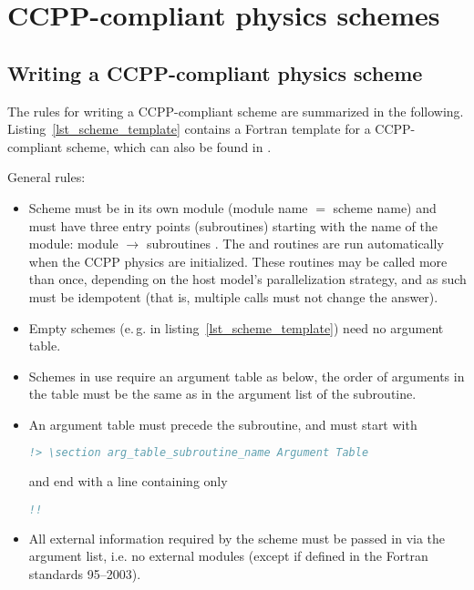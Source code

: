 \chapter{CCPP-compliant physics schemes}
\label{chap_schemes}
\setlength{\parskip}{12pt}

\section{Writing a CCPP-compliant physics scheme}
\label{sec_writescheme}
The rules for writing a CCPP-compliant scheme are summarized in the following. Listing~\ref{lst_scheme_template} contains a Fortran template for a CCPP-compliant scheme, which can also be found in .

General rules:
\begin{itemize}
\item Scheme must be in its own module (module name $=$ scheme name) and must have three entry points (subroutines) starting with the name of the module: module  $\rightarrow$ subroutines . The  and  routines are run automatically when the CCPP physics are initialized. These routines may be called more than once, depending on the host model's parallelization strategy, and as such must be idempotent (that is, multiple calls must not change the answer).
\item Empty schemes (e.\,g.  in listing~\ref{lst_scheme_template}) need no argument table.
\item Schemes in use require an argument table as below, the order of arguments in the table must be the same as in the argument list of the subroutine.
\item An argument table must precede the subroutine, and must start with
\begin{lstlisting}[language=Fortran]
!> \section arg_table_subroutine_name Argument Table
\end{lstlisting}
and end with a line containing only
\begin{lstlisting}[language=Fortran]
!!
\end{lstlisting}
\item All external information required by the scheme must be passed in via the argument list, i.e. no external modules (except if defined in the Fortran standards 95--2003).

\end{itemize}
